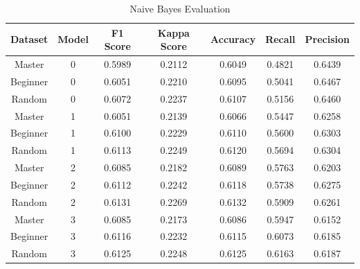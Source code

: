 \begin{table}[H]
    \centering
    \begin{tabular}{|c|c|c|c|c|c|c|}
    \hline
    \textbf{Dataset} & \textbf{Model} & \textbf{F1 Score} & \textbf{Kappa Score} & \textbf{Accuracy} & \textbf{Recall} & \textbf{Precision} \\ \hline
    Master           & 0              & 0.5989            & 0.2112              & 0.6049            & 0.4821         & 0.6439            \\ \hline
    Beginner         & 0              & 0.6051            & 0.2210              & 0.6095            & 0.5041         & 0.6467            \\ \hline
    Random           & 0              & 0.6072            & 0.2237              & 0.6107            & 0.5156         & 0.6460            \\ \hline
    Master           & 1              & 0.6051            & 0.2139              & 0.6066            & 0.5447         & 0.6258            \\ \hline
    Beginner         & 1              & 0.6100            & 0.2229              & 0.6110            & 0.5600         & 0.6303            \\ \hline
    Random           & 1              & 0.6113            & 0.2249              & 0.6120            & 0.5694         & 0.6304            \\ \hline
    Master           & 2              & 0.6085            & 0.2182              & 0.6089            & 0.5763         & 0.6203            \\ \hline
    Beginner         & 2              & 0.6112            & 0.2242              & 0.6118            & 0.5738         & 0.6275            \\ \hline
    Random           & 2              & 0.6131            & 0.2269              & 0.6132            & 0.5909         & 0.6261            \\ \hline
    Master           & 3              & 0.6085            & 0.2173              & 0.6086            & 0.5947         & 0.6152            \\ \hline
    Beginner         & 3              & 0.6116            & 0.2232              & 0.6115            & 0.6073         & 0.6185            \\ \hline
    Random           & 3              & 0.6125            & 0.2248              & 0.6125            & 0.6163         & 0.6187            \\ \hline
    \end{tabular}
    \caption{Naive Bayes Evaluation}
    \label{tab:naive_bayes_evaluation}
\end{table}


